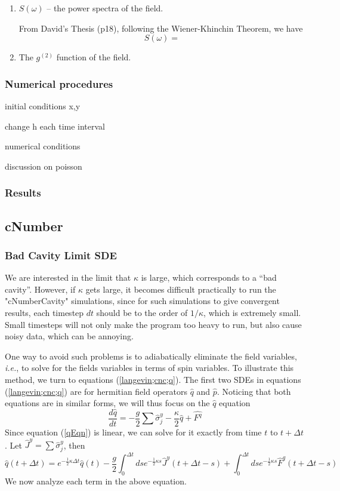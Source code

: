 \documentclass{article}
\begin{document}
\begin{enumerate}
    \item $S(\omega)$ \--- the power spectra of the field. 
    
    From David's Thesis (p18), following the Wiener-Khinchin Theorem, we have
    \begin{equation}
            S(\omega) =
        \end{equation}
    \item The $g^{(2)}$ function of the field.
\end{enumerate}
\subsubsection{Numerical procedures}
initial conditions x,y

change h each time interval

numerical conditions

discussion on poisson
\subsubsection{Results}





\subsection{cNumber}
\subsubsection{Bad Cavity Limit SDE}
We are interested in the limit that $\kappa$ is large, which corresponds to a ``bad cavity''. However, if $\kappa$ gets large, it becomes difficult practically to run the "cNumberCavity" simulations, since for such simulations to give convergent results, each timestep $dt$ should be to the order of $1/\kappa$, which is extremely small. Small timesteps will not only make the program too heavy to run, but also cause noisy data, which can be annoying. 

One way to avoid such problems is to adiabatically eliminate the field variables, \textit{i.e.}, to solve for the fields variables in terms of spin variables. To illustrate this method, we turn to equations (\ref{langevin;cnc;q}). The first two SDEs in equations (\ref{langevin;cnc;q}) are for hermitian field operators $\hat{q}$ and $\hat{p}$. Noticing that both equations are in similar forms, we will thus focus on the $\hat{q}$ equation
\begin{equation}
     \label{qEqn}
     \frac{d \hat{q}}{dt} = -\frac{g}{2}\sum\hat{\sigma}_j^y-\frac{\kappa}{2}\hat{q}+\hat{F^q}
\end{equation}
Since equation (\ref{qEqn}) is linear, we can solve for it exactly from time $t$ to $t+\Delta t$. Let $\hat{J}^y=\sum \hat{\sigma}_j^y$, then
\begin{equation}
\label{qEqn2}
    \hat{q}(t+\Delta t) = e^{-\frac{1}{2}\kappa \Delta t}\hat{q}(t)-\frac{g}{2}\int_0^{\Delta t} ds e^{-\frac{1}{2}\kappa s}\hat{J}^y(t+\Delta t-s)+\int_0^{\Delta t} ds e^{-\frac{1}{2}\kappa s} \hat{F}^q(t+\Delta t-s)
\end{equation}
We now analyze each term in the above equation.
\end{document}
